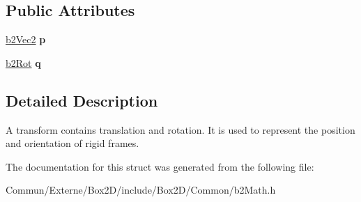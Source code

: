 \subsection*{Public Attributes}
\begin{DoxyCompactItemize}
\item 
\hyperlink{structb2_vec2}{b2\+Vec2} {\bfseries p}\hypertarget{structb2_transform_a9eeeb643a016c29a4d389e480ba6c628}{}\label{structb2_transform_a9eeeb643a016c29a4d389e480ba6c628}

\item 
\hyperlink{structb2_rot}{b2\+Rot} {\bfseries q}\hypertarget{structb2_transform_ae4aaac23f32686e165138c4e5dc4ce85}{}\label{structb2_transform_ae4aaac23f32686e165138c4e5dc4ce85}

\end{DoxyCompactItemize}


\subsection{Detailed Description}
A transform contains translation and rotation. It is used to represent the position and orientation of rigid frames. 

The documentation for this struct was generated from the following file\+:\begin{DoxyCompactItemize}
\item 
Commun/\+Externe/\+Box2\+D/include/\+Box2\+D/\+Common/b2\+Math.\+h\end{DoxyCompactItemize}
